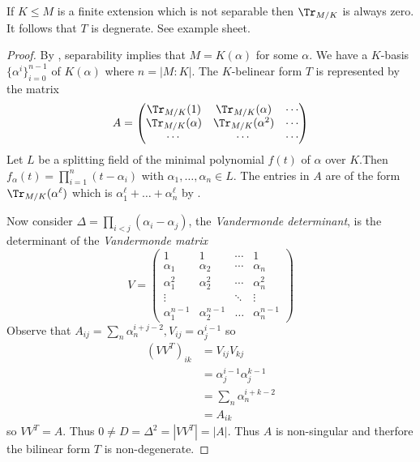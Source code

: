 \documentclass[a4paper]{article}
\begin{document}
\begin{remark}
  If \(K \leq M\) is a finite extension which is not separable then \(\Tr_{M/K}\) is always zero. It follows that \(T\) is degnerate. See example sheet.
\end{remark}

\begin{proof}
  \label{proof:vandermonde}
  By , separability implies that \(M = K(\alpha)\) for some \(\alpha\). We have a \(K\)-basis \(\{\alpha^i\}_{i = 0}^{n - 1}\) of \(K(\alpha)\) where \(n = |M:K|\). The \(K\)-belinear form \(T\) is represented by the matrix
  \[
    A =
    \begin{pmatrix}
      \Tr_{M/K}(1) & \Tr_{M/K}(\alpha) & \cdots \\
      \Tr_{M/K}(\alpha) & \Tr_{M/K}(\alpha^2) & \cdots \\
      \cdots & \cdots & \cdots
    \end{pmatrix}
  \]
  Let \(L\) be a splitting field of the minimal polynomial \(f(t)\) of \(\alpha\) over \(K\).Then \(f_\alpha(t) = \prod_{i = 1}^n (t - \alpha_i)\) with \(\alpha_1, \dots, \alpha_n \in L\). The entries in \(A\) are of the form \(\Tr_{M/K}(\alpha^\ell)\) which is \(\alpha_1^\ell + \dots + \alpha_n^\ell\) by .

  Now consider \(\Delta = \prod_{i < j} (\alpha_i - \alpha_j)\), the \emph{Vandermonde determinant}, is the determinant of the \emph{Vandermonde matrix}
  \[
    V =
    \begin{pmatrix}
      1 & 1 & \cdots & 1 \\
      \alpha_1 & \alpha_2 & \cdots & \alpha_n \\
      \alpha_1^2 & \alpha_2^2 & \cdots & \alpha_n^2 \\
      \vdots & & \ddots & \vdots \\
      \alpha_1^{n - 1} & \alpha_2^{n - 1} & \dots & \alpha_n^{n - 1}
    \end{pmatrix}
  \]
  Observe that \(A_{ij} = \sum_n \alpha_n^{i + j - 2}, V_{ij} = \alpha_j^{i - 1}\) so
  \begin{align*}
    (VV^T)_{ik} &= V_{ij}V_{kj} \\
                &= \alpha_j^{i - 1} \alpha_j^{k - 1} \\
                &= \sum_n \alpha_n^{i + k - 2} \\
                &= A_{ik}
  \end{align*}
  so \(VV^T = A\). Thus \(0 \neq D = \Delta^2 = |VV^T| = |A|\). Thus \(A\) is non-singular and therfore the bilinear form \(T\) is non-degenerate.
\end{proof}
\end{document}
